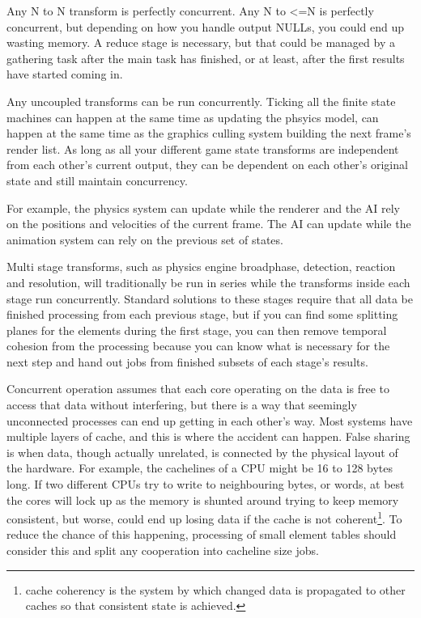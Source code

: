 Any N to N transform is perfectly concurrent. Any N to <=N is perfectly
concurrent, but depending on how you handle output NULLs, you could end up
wasting memory. A reduce stage is necessary, but that could be managed by a
gathering task after the main task has finished, or at least, after the first
results have started coming in.

Any uncoupled transforms can be run concurrently. Ticking all the finite state
machines can happen at the same time as updating the phsyics model, can happen
at the same time as the graphics culling system building the next frame's
render list. As long as all your different game state transforms are
independent from each other's current output, they can be dependent on each
other's original state and still maintain concurrency.

For example, the physics system can update while the renderer and the AI rely
on the positions and velocities of the current frame. The AI can update while
the animation system can rely on the previous set of states.

Multi stage transforms, such as physics engine broadphase, detection, reaction
and resolution, will traditionally be run in series while the transforms inside
each stage run concurrently. Standard solutions to these stages require that
all data be finished processing from each previous stage, but if you can find
some splitting planes for the elements during the first stage, you can then
remove temporal cohesion from the processing because you can know what is
necessary for the next step and hand out jobs from finished subsets of each
stage's results.

Concurrent operation assumes that each core operating on the data is free to
access that data without interfering, but there is a way that seemingly
unconnected processes can end up getting in each other's way. Most systems have
multiple layers of cache, and this is where the accident can happen. False
sharing is when data, though actually unrelated, is connected by the physical
layout of the hardware. For example, the cachelines of a CPU might be 16 to 128
bytes long. If two different CPUs try to write to neighbouring bytes, or words,
at best the cores will lock up as the memory is shunted around trying to keep
memory consistent, but worse, could end up losing data if the cache is not
coherent\footnote{cache coherency is the system by which changed data is
propagated to other caches so that consistent state is achieved.}. To reduce
the chance of this happening, processing of small element tables should
consider this and split any cooperation into cacheline size jobs.

